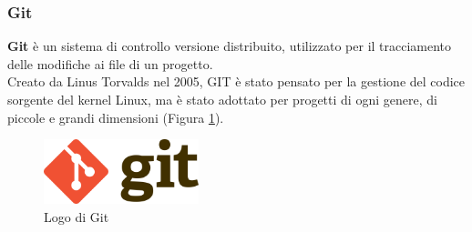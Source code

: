 \subsubsection{Git}
\textbf{Git} è un sistema di controllo versione distribuito, utilizzato per il tracciamento delle modifiche ai file di un progetto.\\ 
Creato da Linus Torvalds nel 2005, GIT è stato pensato per la gestione del codice sorgente del kernel Linux, ma è stato adottato 
per progetti di ogni genere, di piccole e grandi dimensioni (Figura \ref{fig:git}).\\
\begin{figure}[hpp]
    \centering
    \includegraphics[width=0.4\textwidth]{images/tecnologie/logo_git.png}
    \caption{Logo di Git}
    \label{fig:git}
\end{figure}

